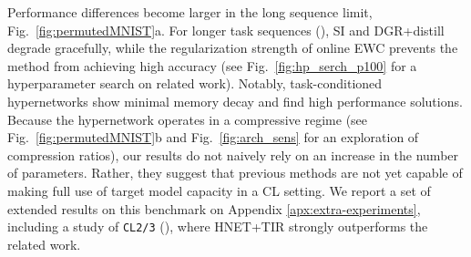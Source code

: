 \documentclass{article}
\begin{document}
Performance differences become larger in the long sequence limit, Fig.~\ref{fig:permutedMNIST}a. For longer task sequences (), SI and DGR+distill \citep{shin_continual_2017,van_de_ven_generative_2018} degrade gracefully, while the regularization strength of online EWC prevents the method from achieving high accuracy (see Fig.~\ref{fig:hp_serch_p100} for a hyperparameter search on related work). Notably, task-conditioned hypernetworks show minimal memory decay and find high performance solutions. Because the hypernetwork operates in a compressive regime (see Fig.~\ref{fig:permutedMNIST}b and Fig.~\ref{fig:arch_sens} for an exploration of compression ratios), our results do not naively rely on an increase in the number of parameters. Rather, they suggest that previous methods are not yet capable of making full use of target model capacity in a CL setting. We report a set of extended results on this benchmark on Appendix \ref{apx:extra-experiments}, including a study of \texttt{CL2/3} (), where HNET+TIR strongly outperforms the related work.
\end{document}
